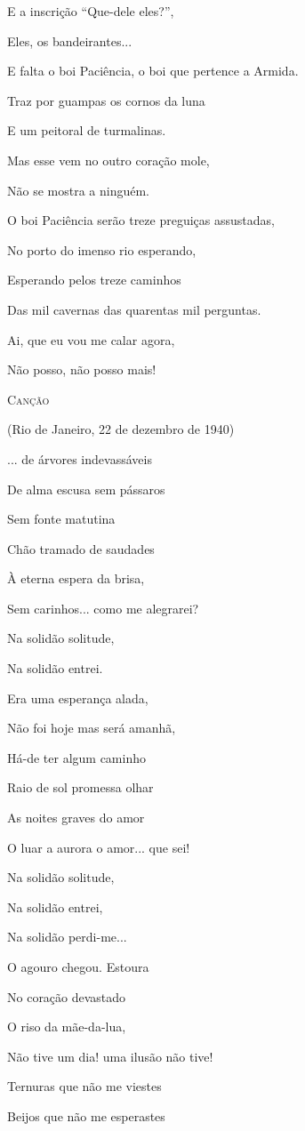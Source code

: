 E a inscrição ``Que-dele eles?'',

Eles, os bandeirantes...

E falta o boi Paciência, o boi que pertence a Armida.

Traz por guampas os cornos da luna

E um peitoral de turmalinas.

Mas esse vem no outro coração mole,

Não se mostra a ninguém.

O boi Paciência serão treze preguiças assustadas,

No porto do imenso rio esperando,

Esperando pelos treze caminhos

Das mil cavernas das quarentas mil perguntas.

Ai, que eu vou me calar agora,

Não posso, não posso mais!

\textsc{Canção}

(Rio de Janeiro, 22 de dezembro de 1940)

... de árvores indevassáveis

De alma escusa sem pássaros

Sem fonte matutina

Chão tramado de saudades

À eterna espera da brisa,

Sem carinhos... como me alegrarei?

Na solidão solitude,

Na solidão entrei.

Era uma esperança alada,

Não foi hoje mas será amanhã,

Há-de ter algum caminho

Raio de sol promessa olhar

As noites graves do amor

O luar a aurora o amor... que sei!

Na solidão solitude,

Na solidão entrei,

Na solidão perdi-me...

O agouro chegou. Estoura

No coração devastado

O riso da mãe-da-lua,

Não tive um dia! uma ilusão não tive!

Ternuras que não me viestes

Beijos que não me esperastes

